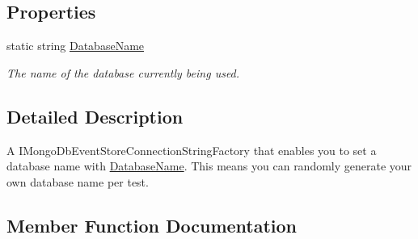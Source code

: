 \subsection*{Properties}
\begin{DoxyCompactItemize}
\item 
static string \hyperlink{classCqrs_1_1MongoDB_1_1Tests_1_1Integration_1_1TestMongoDbSnapshotStoreConnectionStringFactory_a7c9e2a69f78de292d276cca3ee740394_a7c9e2a69f78de292d276cca3ee740394}{Database\+Name}
\begin{DoxyCompactList}\small\item\em The name of the database currently being used. \end{DoxyCompactList}\end{DoxyCompactItemize}


\subsection{Detailed Description}
A I\+Mongo\+Db\+Event\+Store\+Connection\+String\+Factory that enables you to set a database name with \hyperlink{classCqrs_1_1MongoDB_1_1Tests_1_1Integration_1_1TestMongoDbSnapshotStoreConnectionStringFactory_a7c9e2a69f78de292d276cca3ee740394_a7c9e2a69f78de292d276cca3ee740394}{Database\+Name}. This means you can randomly generate your own database name per test. 



\subsection{Member Function Documentation}
\mbox{\label{classCqrs_1_1MongoDB_1_1Tests_1_1Integration_1_1TestMongoDbSnapshotStoreConnectionStringFactory_ab75d7becd2ca0feb70315778cfa63b9c_ab75d7becd2ca0feb70315778cfa63b9c}} 
